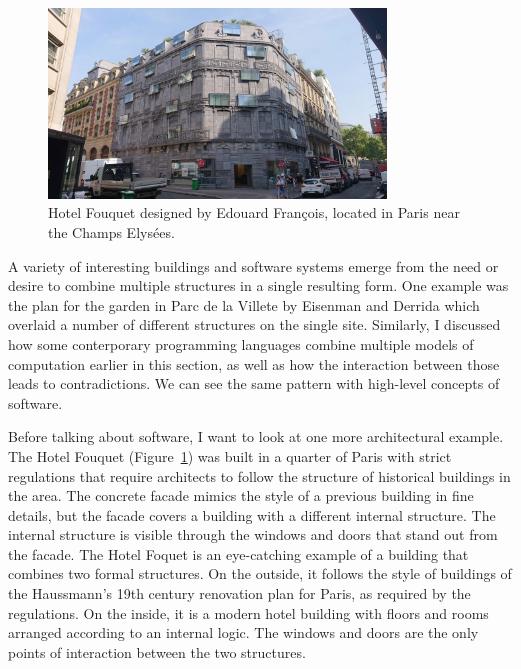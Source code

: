 \begin{figure}
\centering
\vspace{-1em}
\includegraphics[width=0.8\textwidth]{fig/foquet.jpg}
\caption{Hotel Fouquet designed by Edouard Fran\c{c}ois, located in Paris near the Champs Elys\'ees.}
\label{fig:hotel}
\end{figure}

A variety of interesting buildings and software systems emerge from the need or desire to combine
multiple structures in a single resulting form. One example was the plan for the garden in Parc
de la Villete by Eisenman and Derrida which overlaid a number of different structures on the single
site. Similarly, I discussed how some conterporary programming languages combine multiple models
of computation earlier in this section, as well as how the interaction between those leads to
contradictions. We can see the same pattern with high-level concepts of software.

Before talking about software, I want to look at one more architectural example.
The Hotel Fouquet (Figure~\ref{fig:hotel}) was built in a quarter of Paris with
strict regulations that require architects to follow the structure of historical
buildings in the area. The concrete facade mimics the style of a previous building in
fine details, but the facade covers a building with a different internal structure.
The internal structure is visible through the windows and doors that stand out from the facade.
The Hotel Foquet is an eye-catching example of a building that combines two formal structures.
On the outside, it follows the style of buildings of the Haussmann's 19th century renovation
plan for Paris, as required by the regulations. On the inside, it is a modern hotel building with
floors and rooms arranged according to an internal logic. The windows and doors are the only
points of interaction between the two structures.

